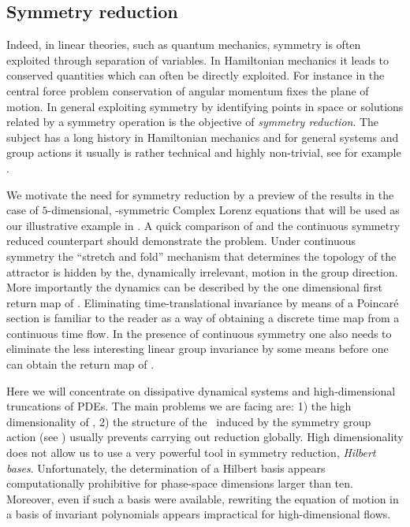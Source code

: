 \subsection{Symmetry reduction}

Indeed, in linear theories, such as quantum mechanics, symmetry is often exploited
through separation of variables. In Hamiltonian mechanics it leads to conserved quantities which can often be
directly exploited. For instance in the central force problem conservation of angular momentum fixes the plane
of motion.
In general exploiting symmetry by identifying points in space or solutions
related by a symmetry operation is the objective of
\emph{symmetry reduction}. The subject has a long history in Hamiltonian mechanics and for general systems
and group actions it usually is rather technical and highly non-trivial, see for example
.

We motivate the need for symmetry reduction by a preview of the results in the case of $5$-dimensional,
-symmetric Complex Lorenz equations that will be used as our illustrative example in .
 A quick comparison of
 and the continuous symmetry reduced  counterpart should demonstrate the problem.
Under continuous symmetry the ``stretch and fold'' mechanism that determines the topology of the attractor
is hidden by the, dynamically irrelevant, motion in the group direction. More importantly the dynamics can
be described by the one dimensional first return map of . Eliminating time-translational
invariance by means of a Poincar\'e section is familiar to the reader as a way of obtaining a discrete time map from
a continuous time flow. In the presence of continuous symmetry one also needs to eliminate the less interesting
linear group invariance by some means before one can obtain the return map of .

Here we will concentrate on dissipative dynamical systems and high-dimensional truncations
of PDEs. The main problems we are facing are: 1) the high dimensionality of \statesp, 2) the structure of
the \statesp\ induced by the symmetry group action (see )
usually prevents carrying out reduction globally.
High dimensionality does not allow us to use a very powerful
tool in symmetry reduction, \emph{Hilbert bases}.
Unfortunately, the determination of a Hilbert basis appears
computationally prohibitive for phase-space dimensions
larger than ten. Moreover, even
if such a basis were available, rewriting the equation of
motion in a basis of invariant polynomials appears
impractical for high-dimensional flows.

